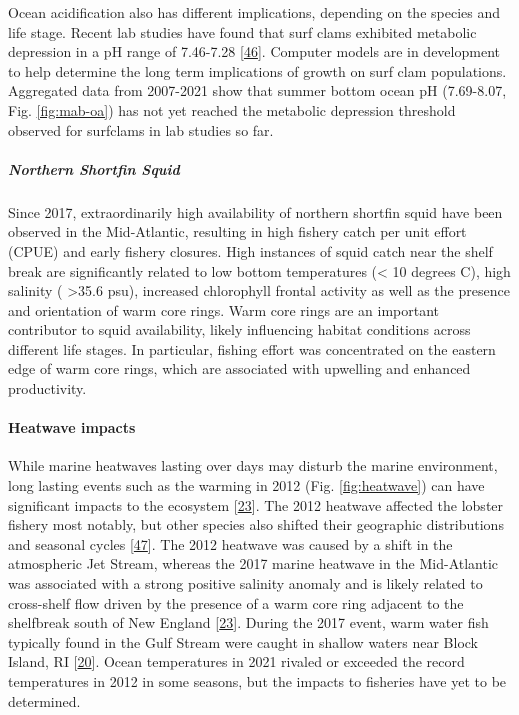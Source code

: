 \documentclass[
  10pt,
]{article}
\begin{document}
Ocean acidification also has different implications, depending on the
species and life stage. Recent lab studies have found that surf clams
exhibited metabolic depression in a pH range of 7.46-7.28
{[}\protect\hyperlink{ref-pousse_energetic_2020}{46}{]}. Computer models
are in development to help determine the long term implications of
growth on surf clam populations. Aggregated data from 2007-2021 show
that summer bottom ocean pH (7.69-8.07, Fig. \ref{fig:mab-oa}) has not
yet reached the metabolic depression threshold observed for surfclams in
lab studies so far.

\hypertarget{northern-shortfin-squid}{%
\subparagraph{\texorpdfstring{\emph{Northern Shortfin
Squid}}{Northern Shortfin Squid}}\label{northern-shortfin-squid}}

Since 2017, extraordinarily high availability of northern shortfin squid
have been observed in the Mid-Atlantic, resulting in high fishery catch
per unit effort (CPUE) and early fishery closures. High instances of
squid catch near the shelf break are significantly related to low bottom
temperatures (\textless{} 10 degrees C), high salinity (
\textgreater35.6 psu), increased chlorophyll frontal activity as well as
the presence and orientation of warm core rings. Warm core rings are an
important contributor to squid availability, likely influencing habitat
conditions across different life stages. In particular, fishing effort
was concentrated on the eastern edge of warm core rings, which are
associated with upwelling and enhanced productivity.

\hypertarget{heatwave-impacts}{%
\paragraph{Heatwave impacts}\label{heatwave-impacts}}

While marine heatwaves lasting over days may disturb the marine
environment, long lasting events such as the warming in 2012 (Fig.
\ref{fig:heatwave}) can have significant impacts to the ecosystem
{[}\protect\hyperlink{ref-gawarkiewicz_characteristics_2019}{23}{]}. The
2012 heatwave affected the lobster fishery most notably, but other
species also shifted their geographic distributions and seasonal cycles
{[}\protect\hyperlink{ref-mills_fisheries_2013}{47}{]}. The 2012
heatwave was caused by a shift in the atmospheric Jet Stream, whereas
the 2017 marine heatwave in the Mid-Atlantic was associated with a
strong positive salinity anomaly and is likely related to cross-shelf
flow driven by the presence of a warm core ring adjacent to the
shelfbreak south of New England
{[}\protect\hyperlink{ref-gawarkiewicz_characteristics_2019}{23}{]}.
During the 2017 event, warm water fish typically found in the Gulf
Stream were caught in shallow waters near Block Island, RI
{[}\protect\hyperlink{ref-gawarkiewicz_changing_2018}{20}{]}. Ocean
temperatures in 2021 rivaled or exceeded the record temperatures in 2012
in some seasons, but the impacts to fisheries have yet to be determined.
\end{document}
